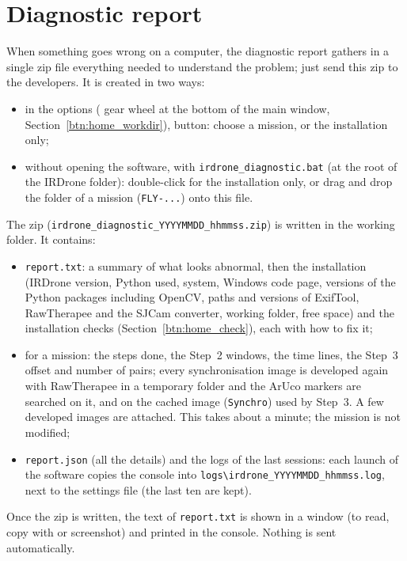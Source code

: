 \documentclass[a4paper,11pt]{report}
\DeclareRobustCommand{\bouton}[1]{\texorpdfstring{\fbox{\small\textsf{#1}}}{#1}}
\begin{document}
\section{Diagnostic report}\label{btn:home_diagnostic}
When something goes wrong on a computer, the diagnostic report gathers in a single zip file everything needed to understand the problem; just send this zip to the developers. It is created in two ways:
\begin{itemize}
  \item in the options (\bouton{⚙} gear wheel at the bottom of the main window, Section~\ref{btn:home_workdir}), \bouton{Create a diagnostic report…} button: choose a mission, or the installation only;
  \item without opening the software, with \texttt{irdrone\_diagnostic.bat} (at the root of the IRDrone folder): double-click for the installation only, or drag and drop the folder of a mission (\texttt{FLY-...}) onto this file.
\end{itemize}
The zip (\texttt{irdrone\_diagnostic\_YYYYMMDD\_hhmmss.zip}) is written in the working folder. It contains:
\begin{itemize}
  \item \texttt{report.txt}: a summary of what looks abnormal, then the installation (IRDrone version, Python used, system, Windows code page, versions of the Python packages including OpenCV, paths and versions of ExifTool, RawTherapee and the SJCam converter, working folder, free space) and the installation checks (Section~\ref{btn:home_check}), each with how to fix it;
  \item for a mission: the steps done, the Step~2 windows, the time lines, the Step~3 offset and number of pairs; every synchronisation image is developed again with RawTherapee in a temporary folder and the ArUco markers are searched on it, and on the cached image (\texttt{Synchro}) used by Step~3. A few developed images are attached. This takes about a minute; the mission is not modified;
  \item \texttt{report.json} (all the details) and the logs of the last sessions: each launch of the software copies the console into \texttt{logs\textbackslash irdrone\_YYYYMMDD\_hhmmss.log}, next to the settings file (the last ten are kept).
\end{itemize}
Once the zip is written, the text of \texttt{report.txt} is shown in a window (to read, copy with \bouton{Copy the text} or screenshot) and printed in the console. Nothing is sent automatically.
\end{document}
